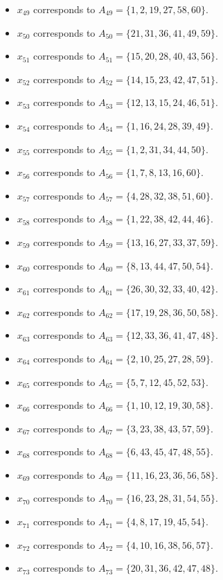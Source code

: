 \documentclass[11pt]{article}
\begin{document}
\begin{itemize}
\item $x_{49}$ corresponds to $A_{49}=\{1, 2, 19, 27, 58, 60\}$.
\item $x_{50}$ corresponds to $A_{50}=\{21, 31, 36, 41, 49, 59\}$.
\item $x_{51}$ corresponds to $A_{51}=\{15, 20, 28, 40, 43, 56\}$.
\item $x_{52}$ corresponds to $A_{52}=\{14, 15, 23, 42, 47, 51\}$.
\item $x_{53}$ corresponds to $A_{53}=\{12, 13, 15, 24, 46, 51\}$.
\item $x_{54}$ corresponds to $A_{54}=\{1, 16, 24, 28, 39, 49\}$.
\item $x_{55}$ corresponds to $A_{55}=\{1, 2, 31, 34, 44, 50\}$.
\item $x_{56}$ corresponds to $A_{56}=\{1, 7, 8, 13, 16, 60\}$.
\item $x_{57}$ corresponds to $A_{57}=\{4, 28, 32, 38, 51, 60\}$.
\item $x_{58}$ corresponds to $A_{58}=\{1, 22, 38, 42, 44, 46\}$.
\item $x_{59}$ corresponds to $A_{59}=\{13, 16, 27, 33, 37, 59\}$.
\item $x_{60}$ corresponds to $A_{60}=\{8, 13, 44, 47, 50, 54\}$.
\item $x_{61}$ corresponds to $A_{61}=\{26, 30, 32, 33, 40, 42\}$.
\item $x_{62}$ corresponds to $A_{62}=\{17, 19, 28, 36, 50, 58\}$.
\item $x_{63}$ corresponds to $A_{63}=\{12, 33, 36, 41, 47, 48\}$.
\item $x_{64}$ corresponds to $A_{64}=\{2, 10, 25, 27, 28, 59\}$.
\item $x_{65}$ corresponds to $A_{65}=\{5, 7, 12, 45, 52, 53\}$.
\item $x_{66}$ corresponds to $A_{66}=\{1, 10, 12, 19, 30, 58\}$.
\item $x_{67}$ corresponds to $A_{67}=\{3, 23, 38, 43, 57, 59\}$.
\item $x_{68}$ corresponds to $A_{68}=\{6, 43, 45, 47, 48, 55\}$.
\item $x_{69}$ corresponds to $A_{69}=\{11, 16, 23, 36, 56, 58\}$.
\item $x_{70}$ corresponds to $A_{70}=\{16, 23, 28, 31, 54, 55\}$.
\item $x_{71}$ corresponds to $A_{71}=\{4, 8, 17, 19, 45, 54\}$.
\item $x_{72}$ corresponds to $A_{72}=\{4, 10, 16, 38, 56, 57\}$.
\item $x_{73}$ corresponds to $A_{73}=\{20, 31, 36, 42, 47, 48\}$.

\end{itemize}
\end{document}
